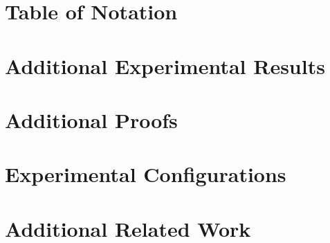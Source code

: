 \label{sec:supp}

\allowdisplaybreaks
{}

\section{Table of Notation}




\onecolumn 
\clearpage

\section{Additional Experimental Results}

\printAffiliationsAndNotice{\icmlEqualContribution} %



\clearpage

\section{Additional Proofs}


\clearpage

\section{Experimental Configurations}


\clearpage

\section{Additional Related Work}


